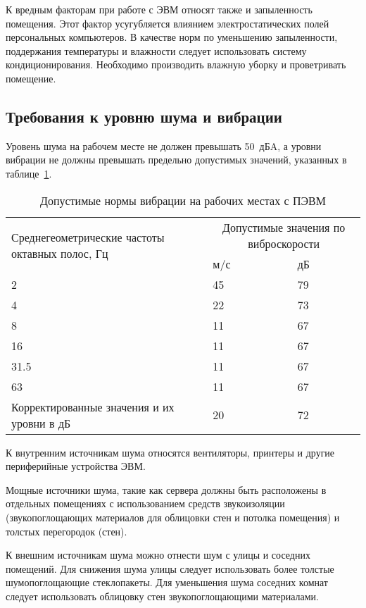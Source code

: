 К вредным факторам при работе с ЭВМ относят также и запыленность помещения.
Этот фактор усугубляется влиянием электростатических полей персональных
компьютеров. В качестве норм по уменьшению запыленности, поддержания
температуры и влажности следует использовать систему кондиционирования.
Необходимо производить влажную уборку и проветривать помещение.

\subsection{Требования к уровню шума и вибрации}
Уровень шума на рабочем месте не должен превышать 50~дБA, а уровни вибрации не
должны превышать предельно допустимых значений, указанных в
таблице~\ref{tab:vibration}.

\begin{table}[ht]
  \centering
  \caption{Допустимые нормы вибрации на рабочих местах с ПЭВМ}
  \label{tab:vibration}
  \begin{tabular}{|p{}|p{}|p{}|}
    \hline
    \multirow{2}{\hsize}{Среднегеометрические частоты октавных полос, Гц} &
    \multicolumn{2}{|c|}{Допустимые значения по виброскорости} \\
    \cline{2-3}
    & м/с & дБ \\
    \hline
    2 & 45 & 79 \\
    \hline
    4 & 22 & 73 \\
    \hline
    8 & 11 & 67\\
    \hline
    16 & 11 & 67 \\
    \hline
    31.5 & 11 & 67 \\
    \hline
    63 & 11 & 67 \\
    \hline
    Корректированные значения и их уровни в дБ & 20 & 72 \\
    \hline
  \end{tabular}
\end{table}

К внутренним источникам шума относятся вентиляторы, принтеры и другие
периферийные устройства ЭВМ.

Мощные источники шума, такие как сервера должны быть расположены в отдельных
помещениях с использованием средств звукоизоляции (звукопоглощающих материалов
для облицовки стен и потолка помещения) и толстых перегородок (стен).

К внешним источникам шума можно отнести шум с улицы и соседних помещений. Для
снижения шума улицы следует использовать более толстые шумопоглощающие
стеклопакеты. Для уменьшения шума соседних комнат следует использовать облицовку
стен звукопоглощающими материалами.

